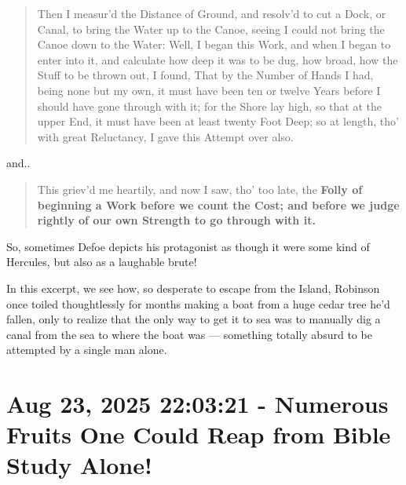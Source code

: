\documentclass[a4paper]{article}
\begin{document}
\noindent
\begin{minipage}{1\textwidth}
\vspace{1em}
\begin{quotation}
{\ttfamily


Then I measur’d the Distance of Ground, and resolv’d to cut a Dock, or Canal, to bring the Water up to the Canoe, seeing I could not bring the Canoe down to the Water: Well, I began this Work, and when I began to enter into it, and calculate how deep it was to be dug, how broad, how the Stuff to be thrown out, I found, That by the Number of Hands I had, being none but my own, it must have been ten or twelve Years before I should have gone through with it; for the Shore lay high, so that at the upper End, it must have been at least twenty Foot Deep; so at length, tho’ with great Reluctancy, I gave this Attempt over also.

}
\end{quotation}
\vspace{1em}
\end{minipage}


and..


\noindent
\begin{minipage}{1\textwidth}
\vspace{1em}
\begin{quotation}
{\ttfamily


This griev’d me heartily, and now I saw, tho’ too late, the \textbf{Folly of beginning a Work before we count the Cost; and before we judge rightly of our own Strength to go through with it.}

}
\end{quotation}
\vspace{1em}
\end{minipage}




So, sometimes Defoe depicts his protagonist as though it were some kind of Hercules, but also as a laughable brute!

In this excerpt, we see how, so desperate to escape from the Island, Robinson once toiled thoughtlessly for months making a boat from a huge cedar tree he'd fallen, only to realize that the only way to get it to sea was to manually dig a canal from the sea to where the boat was --- something totally absurd to be attempted by a single man alone.




\section{Aug 23, 2025 22:03:21 - Numerous Fruits One Could Reap from Bible Study Alone!}
\label{SEC29}
\end{document}

